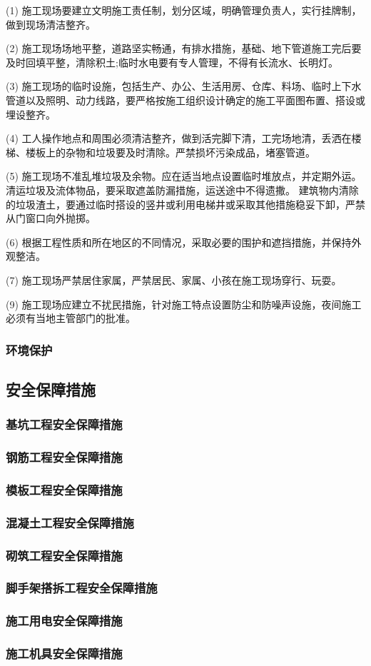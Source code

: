(1) 施工现场要建立文明施工责任制，划分区域，明确管理负责人，实行挂牌制，做到现场清洁整齐。

(2) 施工现场场地平整，道路坚实畅通，有排水措施，基础、地下管道施工完后要及时回填平整，清除积土;临时水电要有专人管理，不得有长流水、长明灯。

(3) 施工现场的临时设施，包括生产、办公、生活用房、仓库、料场、临时上下水管道以及照明、动力线路，要严格按施工组织设计确定的施工平面图布置、搭设或埋设整齐。

(4) 工人操作地点和周围必须清洁整齐，做到活完脚下清，工完场地清，丢洒在楼梯、楼板上的杂物和垃圾要及时清除。严禁损坏污染成品，堵塞管道。

(5) 施工现场不准乱堆垃圾及余物。应在适当地点设置临时堆放点，并定期外运。清运垃圾及流体物品，要采取遮盖防漏措施，运送途中不得遗撒。
建筑物内清除的垃圾渣土，要通过临时搭设的竖井或利用电梯井或采取其他措施稳妥下卸，严禁从门窗口向外抛掷。

(6) 根据工程性质和所在地区的不同情况，采取必要的围护和遮挡措施，并保持外观整洁。

(7) 施工现场严禁居住家属，严禁居民、家属、小孩在施工现场穿行、玩耍。

(9) 施工现场应建立不扰民措施，针对施工特点设置防尘和防噪声设施，夜间施工必须有当地主管部门的批准。

\subsubsection{环境保护}

\subsection{安全保障措施}
\subsubsection{基坑工程安全保障措施}

\subsubsection{钢筋工程安全保障措施}

\subsubsection{模板工程安全保障措施}

\subsubsection{混凝土工程安全保障措施}

\subsubsection{砌筑工程安全保障措施}

\subsubsection{脚手架搭拆工程安全保障措施}

\subsubsection{施工用电安全保障措施}

\subsubsection{施工机具安全保障措施}

